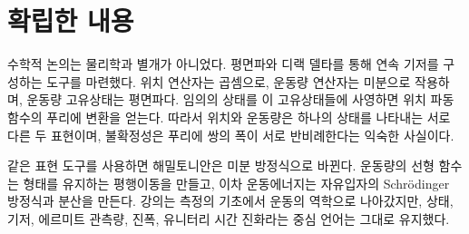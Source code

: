 \section{확립한 내용}

수학적 논의는 물리학과 별개가 아니었다. 평면파와 디랙 델타를 통해 연속 기저를 구성하는 도구를 마련했다. 위치 연산자는 곱셈으로, 운동량 연산자는 미분으로 작용하며, 운동량 고유상태는 평면파다. 임의의 상태를 이 고유상태들에 사영하면 위치 파동 함수의 푸리에 변환을 얻는다. 따라서 위치와 운동량은 하나의 상태를 나타내는 서로 다른 두 표현이며, 불확정성은 푸리에 쌍의 폭이 서로 반비례한다는 익숙한 사실이다.

같은 표현 도구를 사용하면 해밀토니안은 미분 방정식으로 바뀐다. 운동량의 선형 함수는 형태를 유지하는 평행이동을 만들고, 이차 운동에너지는 자유입자의 Schr\"odinger 방정식과 분산을 만든다. 강의는 측정의 기초에서 운동의 역학으로 나아갔지만, 상태, 기저, 에르미트 관측량, 진폭, 유니터리 시간 진화라는 중심 언어는 그대로 유지했다.
